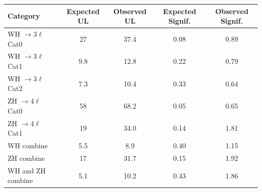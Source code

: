 \begin{table}[!htb]
  \captionsetup{justification=justified}
  \centering
  \begin{tabular}{|l|cc|cc|}
  \hline
   Category                 & Expected UL & Observed UL & Expected Signif.  & Observed Signif. \\
  \hline
  WH $\to 3\ell$  Cat0      & 27          & 37.4        & 0.08              & 0.89  \\
  WH $\to 3\ell$  Cat1      & 9.8         & 12.8        & 0.22              & 0.79  \\
  WH $\to 3\ell$  Cat2      & 7.3         & 10.4        & 0.33              & 0.64  \\
  \hline
  ZH $\to 4\ell$  Cat0      & 58          & 68.2        & 0.05              & 0.65  \\
  ZH $\to 4\ell$  Cat1      & 19          & 34.0        & 0.14              & 1.81  \\
  \hline
  WH combine                & 5.5         & 8.9         & 0.40              & 1.15 \\
  ZH combine                & 17          & 31.7        & 0.15              & 1.92 \\
  WH and ZH combine         & 5.1         & 10.2        & 0.43              & 1.86 \\
  \hline
  \end{tabular}
  \label{tab:vh_results}
\end{table}
  


